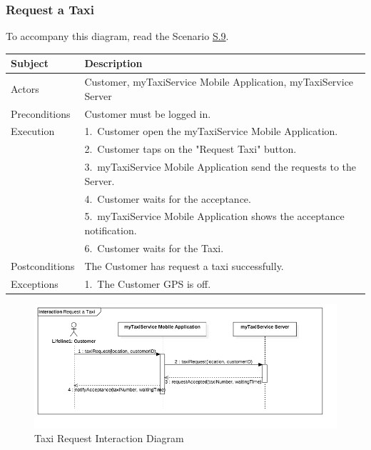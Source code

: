 \subsubsection{Request a Taxi}
			To accompany this diagram, read the Scenario \hyperref[sec:TaxiRequiringScenario]{S.9}.

				\begin{table}[htpb]
					\centering
					\label{tab:TaxiRequestTable}
					\begin{tabularx}{\textwidth}{lp{9cm}}
						\hline
						\hline
							\textbf{Subject}
						& 
							\textbf{Description}\\
						\hline
							Actors	       &  Customer, myTaxiService Mobile Application, myTaxiService Server\\
						\hline
							Preconditions  &  Customer must be logged in.\\
						\hline
							Execution      &  1.~Customer open the myTaxiService Mobile Application.\\
										   &  2.~Customer taps on the "Request Taxi" button.\\
										   &  3.~myTaxiService Mobile Application send the requests to the Server.\\
										   &  4.~Customer waits for the acceptance.\\
										   &  5.~myTaxiService Mobile Application shows the acceptance notification.\\
										   &  6.~Customer waits for the Taxi.\\
						\hline
							Postconditions &  The Customer has request a taxi successfully.\\
						\hline
							Exceptions     &  1.~The Customer GPS is off.\\
									
						\hline
						\hline
					\end{tabularx}
				\end{table}
				
				\begin{figure}[H]
					\centering
					\includegraphics[width=\textwidth, scale=0.5]{IMG/InteractionDiagrams/TaxiRequest.png}
					\caption{Taxi Request Interaction Diagram}\label{sec:FigureTaxiRequest}
				\end{figure}